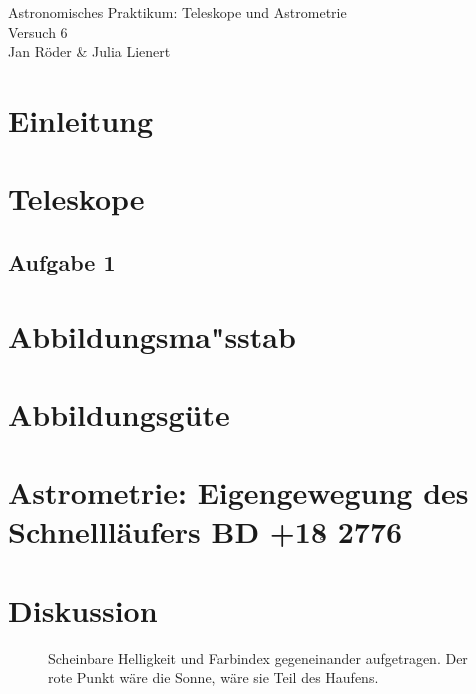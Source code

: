 \documentclass[12pt]{article}
\begin{document}
	\pagestyle{empty}
	

\begin{titlepage}
	\centering
	\bigskip
	\huge{Astronomisches Praktikum: Teleskope und Astrometrie}\\
	\bigskip
	\large{Versuch 6}\\
	\bigskip
	\large{Jan R\"{o}der \& Julia Lienert}
	\bigskip
	\tableofcontents
\end{titlepage}

\pagebreak


\section{Einleitung}



\section{Teleskope}

\subsection{Aufgabe 1}














\section{Abbildungsma"sstab}
\section{Abbildungsg\"{u}te}
\section{Astrometrie: Eigengewegung des \\ Schnelll\"{a}ufers BD +18$\mathring{}$ 2776}




\pagebreak

\section{Diskussion}




\begin{figure} [h]
	\centering
	\caption{Scheinbare Helligkeit und Farbindex gegeneinander aufgetragen. Der rote Punkt w\"{a}re die Sonne, w\"{a}re sie Teil des Haufens.}
	\label{fig:hrd_unknown}
\end{figure}
\end{document}
